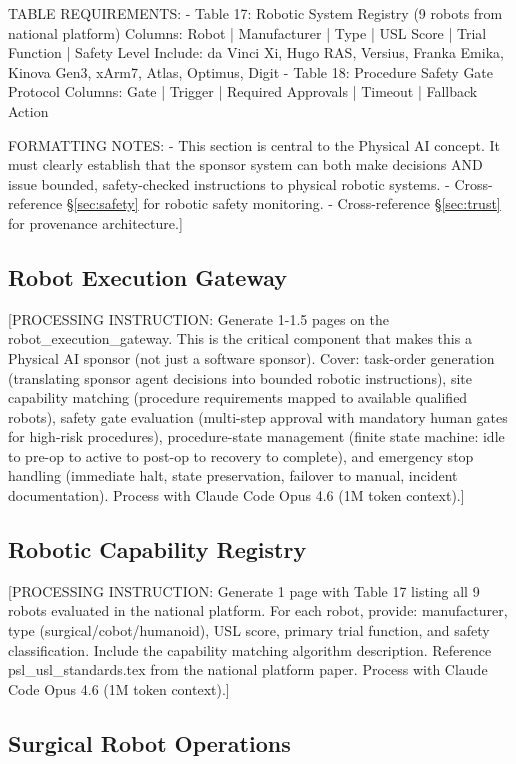 TABLE REQUIREMENTS:
- Table 17: Robotic System Registry (9 robots from national platform)
  Columns: Robot | Manufacturer | Type | USL Score | Trial Function | Safety Level
  Include: da Vinci Xi, Hugo RAS, Versius, Franka Emika, Kinova Gen3,
  xArm7, Atlas, Optimus, Digit
- Table 18: Procedure Safety Gate Protocol
  Columns: Gate | Trigger | Required Approvals | Timeout | Fallback Action

FORMATTING NOTES:
- This section is central to the Physical AI concept. It must clearly establish
  that the sponsor system can both make decisions AND issue bounded, safety-checked
  instructions to physical robotic systems.
- Cross-reference \S\ref{sec:safety} for robotic safety monitoring.
- Cross-reference \S\ref{sec:trust} for provenance architecture.]

\subsection{Robot Execution Gateway}

[PROCESSING INSTRUCTION: Generate 1-1.5 pages on the robot\_execution\_gateway. This is the
critical component that makes this a Physical AI sponsor (not just a software sponsor).
Cover: task-order generation (translating sponsor agent decisions into bounded robotic
instructions), site capability matching (procedure requirements mapped to available
qualified robots), safety gate evaluation (multi-step approval with mandatory human
gates for high-risk procedures), procedure-state management (finite state machine:
idle to pre-op to active to post-op to recovery to complete), and emergency stop handling
(immediate halt, state preservation, failover to manual, incident documentation).
Process with Claude Code Opus 4.6 (1M token context).]

\subsection{Robotic Capability Registry}

[PROCESSING INSTRUCTION: Generate 1 page with Table 17 listing all 9 robots evaluated
in the national platform. For each robot, provide: manufacturer, type (surgical/cobot/humanoid),
USL score, primary trial function, and safety classification. Include the capability
matching algorithm description. Reference psl\_usl\_standards.tex from the national
platform paper. Process with Claude Code Opus 4.6 (1M token context).]

\subsection{Surgical Robot Operations}

